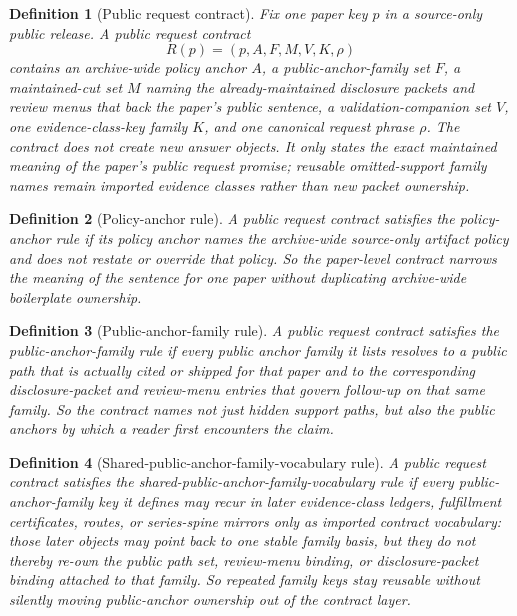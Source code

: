 \documentclass[11pt]{article}
\newtheorem{definition}{Definition}
\begin{document}
\begin{definition}[Public request contract]
Fix one paper key $p$ in a source-only public release.
A \emph{public request contract}
\[
R(p)=(p,A,F,M,V,K,\rho)
\]
contains an archive-wide policy anchor $A$, a public-anchor-family set $F$, a maintained-cut set $M$ naming the already-maintained disclosure packets and review menus that back the paper's public sentence, a validation-companion set $V$, one evidence-class-key family $K$, and one canonical request phrase $\rho$.
The contract does not create new answer objects.
It only states the exact maintained meaning of the paper's public request promise; reusable omitted-support family names remain imported evidence classes rather than new packet ownership.
\end{definition}

\begin{definition}[Policy-anchor rule]
A public request contract satisfies the \emph{policy-anchor rule} if its policy anchor names the archive-wide source-only artifact policy and does not restate or override that policy.
So the paper-level contract narrows the meaning of the sentence for one paper without duplicating archive-wide boilerplate ownership.
\end{definition}

\begin{definition}[Public-anchor-family rule]
A public request contract satisfies the \emph{public-anchor-family rule} if every public anchor family it lists resolves to a public path that is actually cited or shipped for that paper and to the corresponding disclosure-packet and review-menu entries that govern follow-up on that same family.
So the contract names not just hidden support paths, but also the public anchors by which a reader first encounters the claim.
\end{definition}

\begin{definition}[Shared-public-anchor-family-vocabulary rule]
A public request contract satisfies the \emph{shared-public-anchor-family-vocabulary rule} if every public-anchor-family key it defines may recur in later evidence-class ledgers, fulfillment certificates, routes, or series-spine mirrors only as imported contract vocabulary: those later objects may point back to one stable family basis, but they do not thereby re-own the public path set, review-menu binding, or disclosure-packet binding attached to that family.
So repeated family keys stay reusable without silently moving public-anchor ownership out of the contract layer.
\end{definition}
\end{document}

